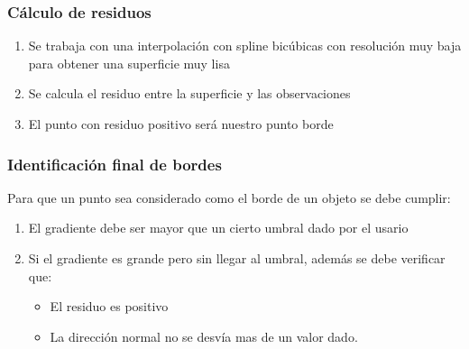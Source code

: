 \begin{frame}
  \frametitle{Cálculo de residuos}%
  \begin{enumerate}[<+->]%
   \item Se trabaja con una interpolación con spline bicúbicas con resolución muy baja 
       para obtener una \alert<1>{superficie muy lisa}%
   \item Se calcula el residuo entre la superficie y las observaciones%
   \item El punto con residuo positivo será nuestro punto \alert<3>{borde} %
  \end{enumerate}%
\end{frame}
\begin{frame}
  \frametitle{Identificación final de bordes}%
  Para que un punto sea considerado como el borde de un objeto se debe cumplir:
  \begin{enumerate}[<+->]%
	\item El gradiente debe ser mayor que un cierto umbral dado por el usario
	\item Si el gradiente es grande pero \alert<2>{sin} llegar al umbral, además se debe verificar que:
	\begin{itemize}
	 \item El residuo es \alert<3>{positivo}
	 \item La dirección normal no se desvía mas de un valor dado.
	\end{itemize}
  \end{enumerate}
\end{frame}
